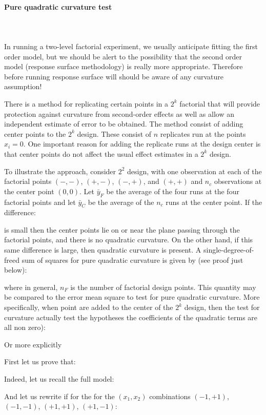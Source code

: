 	\pagebreak
	\paragraph{Pure quadratic curvature test}\mbox{}\\\\
	In running a two-level factorial experiment, we usually anticipate fitting the first order model, but we should be alert to the possibility that the second order model (response surface methodology) is really more appropriate. Therefore before running response surface will should be aware of any curvature assumption!
	
	 There is a method for replicating certain points in a $2^k$ factorial that will provide protection against curvature from second-order effects as well as allow an independent estimate of error to be obtained. The method consist of adding center points to the $2^k$ design. These consist of $n$ replicates run at the points $x_i=0$. One important reason for adding the replicate runs at the design center is that center points do not affect the usual effect estimates in a $2^k$ design.
	
	To illustrate the approach, consider $2^2$ design, with one observation at each of the factorial points $(-,-)$, $(+,-)$, $(-,+)$, and $(+,+)$ and $n_c$ observations at the center point $(0,0)$. Let $\bar{y}_F$ be the average of the four runs at the four factorial points and let $\bar{y}_C$ be the average of the $n_c$ runs at the center point. If the difference:
	
	is small then the center points lie on or near the plane passing through the factorial points, and there is no quadratic curvature. On the other hand, if this same difference is large, then quadratic curvature is present. A single-degree-of-freed sum of squares for pure quadratic curvature is given by (see proof just below):
	
	where in general, $n_F$ is the number of factorial design points. This quantity may be compared to the error mean square to test for pure quadratic curvature. More specifically, when point are added to the center of the $2^k$ design, then the test for curvature actually test the hypotheses the coefficients of the quadratic terms are all non zero):
	
	Or more explicitly
	
	First let us prove that:
	
	Indeed, let us recall the full model:
	
	And let us rewrite if for the for the $(x_1,x_2)$ combinations $(-1,+1)$, $(-1,-1)$, $(+1,+1)$, $(+1,-1)$:
	
